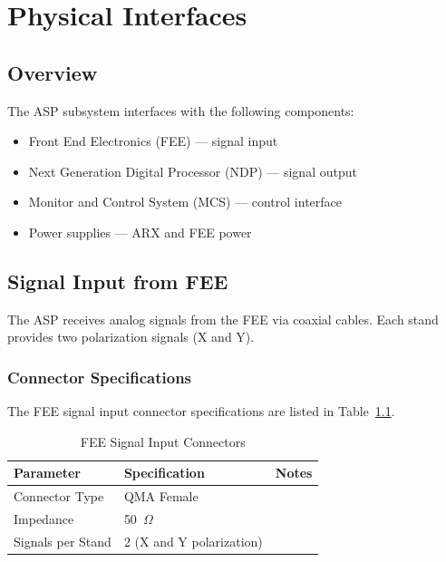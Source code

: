 
\chapter{Physical Interfaces}
\label{sec:physical}

\section{Overview}

The ASP subsystem interfaces with the following components:
\begin{itemize}
    \item Front End Electronics (FEE) --- signal input
    \item Next Generation Digital Processor (NDP) --- signal output
    \item Monitor and Control System (MCS) --- control interface
    \item Power supplies --- ARX and FEE power
\end{itemize}

\section{Signal Input from FEE}

The ASP receives analog signals from the FEE via coaxial cables. Each stand provides two polarization signals (X and Y).

\subsection{Connector Specifications}

The FEE signal input connector specifications are listed in Table~\ref{tab:fee-connectors}.

\begin{table}[htbp]
    \centering
    \caption{FEE Signal Input Connectors}
    \label{tab:fee-connectors}
    \begin{tabular}{lll}
        \toprule
        \textbf{Parameter} & \textbf{Specification} & \textbf{Notes} \\
        \midrule
        Connector Type & QMA Female & \\
        Impedance & 50~$\Omega$ & \\
        Signals per Stand & 2 (X and Y polarization) & \\
        \bottomrule
    \end{tabular}
\end{table}

